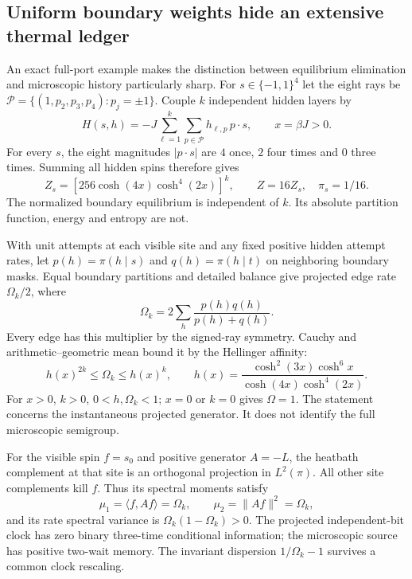 \subsection{Uniform boundary weights hide an extensive thermal ledger}
\label{sec:stars-12}

An exact full-port example makes the distinction between equilibrium
elimination and microscopic history particularly sharp. For
$s\in\{-1,1\}^4$ let the eight rays be
$\mathcal P=\{(1,p_2,p_3,p_4):p_j=\pm1\}$. Couple $k$ independent
hidden layers by
\begin{equation}
 H(s,h)=-J\sum_{\ell=1}^k\sum_{p\in\mathcal P}h_{\ell,p}\,p\cdot s,
 \qquad x=\beta J>0.
\end{equation}
For every $s$, the eight magnitudes $|p\cdot s|$ are $4$ once, $2$ four
times and $0$ three times. Summing all hidden spins therefore gives
\begin{equation}
 Z_s=[256\cosh(4x)\cosh^4(2x)]^k,\qquad
 Z=16Z_s,\quad\pi_s=1/16.
\label{eq:star-partition-12}
\end{equation}
The normalized boundary equilibrium is independent of $k$. Its absolute
partition function, energy and entropy are not.

With unit attempts at each visible site and any fixed positive hidden
attempt rates, let $p(h)=\pi(h\mid s)$ and $q(h)=\pi(h\mid t)$ on
neighboring boundary masks. Equal boundary partitions and detailed balance
give projected edge rate $\Omega_k/2$, where
\begin{equation}
 \Omega_k=2\sum_h\frac{p(h)q(h)}{p(h)+q(h)}.
\end{equation}
Every edge has this multiplier by the signed-ray symmetry. Cauchy and
arithmetic--geometric mean bound it by the Hellinger affinity:
\begin{equation}
 h(x)^{2k}\le\Omega_k\le h(x)^k,\qquad
 h(x)=\frac{\cosh^2(3x)\cosh^6x}{\cosh(4x)\cosh^4(2x)}.
\end{equation}
For $x>0$, $k>0$, $0<h,\Omega_k<1$; $x=0$ or $k=0$ gives
$\Omega=1$. The statement concerns the instantaneous projected
generator. It does not identify the full microscopic semigroup.

For the visible spin $f=s_0$ and positive generator $A=-L$, the heatbath
complement at that site is an orthogonal projection in $L^2(\pi)$.
All other site complements kill $f$. Thus its spectral moments satisfy
\begin{equation}
 \mu_1=\langle f,Af\rangle=\Omega_k,\qquad
 \mu_2=\|Af\|^2=\Omega_k,
\end{equation}
and its rate spectral variance is $\Omega_k(1-\Omega_k)>0$.
The projected independent-bit clock has zero binary three-time conditional
information; the microscopic source has positive two-wait memory.
The invariant dispersion $1/\Omega_k-1$ survives a common clock rescaling.

